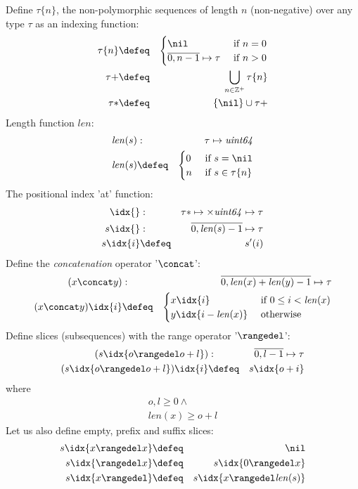 \begin{definition}
Define $\tau\{n\}$, the non-polymorphic sequences of length $n$ (non-negative) over any type $\tau$ as an indexing function:
%
\begin{eqnarray}
\tau\{n\} &\defeq& \begin{cases}\nil&\text{ if } n=0\\
\overline{0,n-1}\mapsto \tau &\text{ if } n>0
\end{cases}\\
\tau{+}&\defeq&\bigcup_{n\in \mathbb{Z}^{+}} \tau\{n\}\\
\tau{*}&\defeq&\{\nil\}\cup\tau{+}\\
\end{eqnarray}
%
Length function $\mathit{len}$:
\begin{eqnarray}
\mathit{len}(s)&:&\tau\mapsto\mathit{uint64} \\
\mathit{len}(s)&\defeq& \begin{cases}
0 & \text{ if  } s=\nil\\
n & \text{ if  } s\in\tau\{n\}
\end{cases}
\end{eqnarray}
%
The positional index 'at' function:
\begin{eqnarray}
\idx{}&:&\tau*\mapsto\times\mathit{uint64}\mapsto\tau\\
s\idx{}&:&\overline{0,\mathit{len}(s)-1}\mapsto\tau\\
s\idx{i}&\defeq&s'(i)   
\end{eqnarray}
%
Define the \emph{concatenation} operator '$\concat$':
\begin{eqnarray}
(x\concat y)&:& \overline{0, \mathit{len}(x) + \mathit{len}(y)-1}\mapsto\tau\\
(x\concat y)\idx{i} &\defeq& \begin{cases}x\idx{i} & \text{ if  } 0\leq i< \mathit{len}(x)\\
y\idx{i-\mathit{len}(x)}&\text{ otherwise } 
\end{cases}
\end{eqnarray}
%
Define slices (subsequences) with the range operator '$\rangedel$':
\begin{eqnarray}
(s\idx{o\rangedel o+l})&:&\overline{0, l-1}\mapsto\tau\\
(s\idx{o\rangedel o+l})\idx{i}&\defeq&s\idx{o+i} 
\end{eqnarray}
where 
\begin{eqnarray}
o, l \geq 0\land\\
\mathit{len}(x)\geq o+l
\end{eqnarray}
%
Let us also define empty, prefix and suffix slices:
\begin{eqnarray}
s\idx{x\rangedel x} &\defeq& \nil\\
s\idx{\rangedel x} &\defeq& s\idx{0\rangedel x}\\        
s\idx{x\rangedel}  &\defeq& s\idx{x\rangedel \mathit{len}(s)}
\end{eqnarray}
\end{definition}
